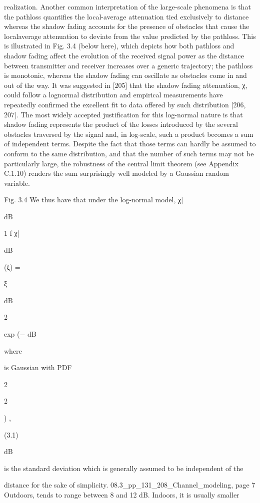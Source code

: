 {{{realization. Another common interpretation of the large-scale phenomena is that the pathloss quantifies the local-average attenuation tied exclusively to distance whereas the shadow fading accounts for the presence of obstacles that cause the localaverage attenuation to deviate from the value predicted by the pathloss. This is illustrated in Fig. 3.4 (below here), which depicts how both pathloss and shadow fading affect the evolution of the received signal power as the distance between transmitter and receiver increases over a generic trajectory; the pathloss is monotonic, whereas the shadow fading can oscillate as obstacles come in and out of the way. It was suggested in [205] that the shadow fading attenuation, χ, could follow a lognormal distribution and empirical measurements have repeatedly confirmed the excellent fit to data offered by such distribution [206, 207]. The most widely accepted justification for this log-normal nature is that shadow fading represents the product of the losses introduced by the several obstacles traversed by the signal and, in log-scale, such a product becomes a sum of independent terms. Despite the fact that those terms can hardly be assumed to conform to the same distribution,
and that the number of such terms may not be particularly large, the robustness of the central limit theorem (see Appendix C.1.10) renders the sum surprisingly well modeled by a Gaussian random variable.

Fig. 3.4 We thus have that under the log-normal model, χ|

dB

1 f χ|

dB

(ξ) =

ξ

dB

2

exp (−
\pi\sigma dB

where \sigma

is Gaussian with PDF

2\sigma

2

) ,

(3.1)

dB

is the standard deviation which is generally assumed to be independent of the

distance for the sake of simplicity.
08.3_pp_131_208_Channel_modeling, page 7 Outdoors, \sigmadB tends to range between 8 and 12 dB. Indoors, it is usually smaller

}}}
